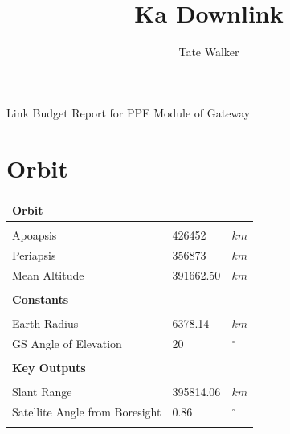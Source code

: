 \documentclass{article}
\title{Ka Downlink}
\author{Tate Walker}
\begin{document}
\maketitle

Link Budget Report for PPE Module of Gateway

\newpage
\section{Orbit}
\label{section::orbit}
\begin{center}
  \begin{tabular}{p{3in}p{1in}l}
\textbf{Orbit} & & \\
\hline \\
Apoapsis & 426452 & $km$ \\
Periapsis & 356873 & $km$ \\
Mean Altitude & 391662.50 & $km$ \\
\\
\textbf{Constants} & & \\
\hline \\
Earth Radius & 6378.14 & $km$ \\
GS Angle of Elevation & 20 & $^{\circ}$ \\
\\
\textbf{Key Outputs} & & \\
\hline \\
Slant Range & 395814.06 & $km$ \\
Satellite Angle from Boresight & 0.86 & $^{\circ}$ \\
\\
\end{tabular}

\end{center}

\newpage
\end{document}
